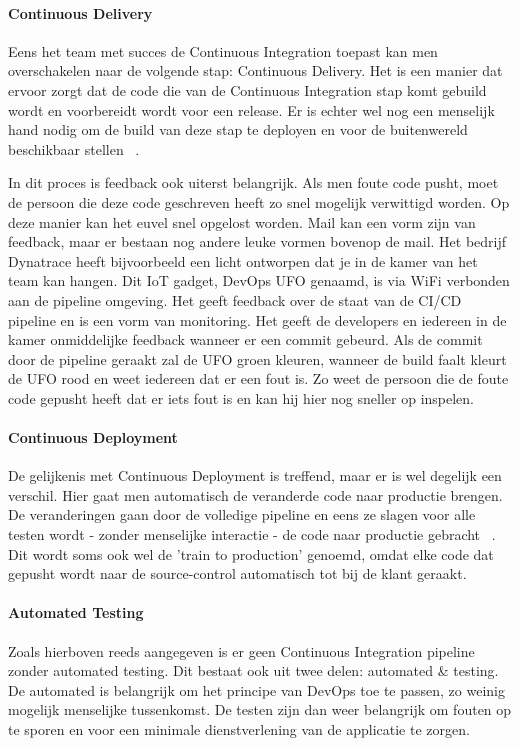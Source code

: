     \paragraph{Continuous Delivery}
    Eens het team met succes de Continuous Integration toepast kan men overschakelen naar de volgende stap: Continuous Delivery.
    Het is een manier dat ervoor zorgt dat de code die van de Continuous Integration stap komt gebuild wordt en voorbereidt wordt voor een release.
    Er is echter wel nog een menselijk hand nodig om de build van deze stap te deployen en voor de buitenwereld beschikbaar stellen ~\autocite{Fowler2013}.
    
    In dit proces is feedback ook uiterst belangrijk. Als men foute code pusht, moet de persoon die deze code geschreven heeft zo snel mogelijk verwittigd worden. Op deze manier kan het euvel snel opgelost worden.
    Mail kan een vorm zijn van feedback, maar er bestaan nog andere leuke vormen bovenop de mail. Het bedrijf Dynatrace heeft bijvoorbeeld een licht ontworpen dat je in de kamer van het team kan hangen. Dit IoT gadget, DevOps UFO genaamd, is via WiFi verbonden aan de pipeline omgeving. Het geeft feedback over de staat van de CI/CD pipeline en is een vorm van monitoring. Het geeft de developers en iedereen in de kamer onmiddelijke feedback wanneer er een commit gebeurd. Als de commit door de pipeline geraakt zal de UFO groen kleuren, wanneer de build faalt kleurt de UFO rood en weet iedereen dat er een fout is. Zo weet de persoon die de foute code gepusht heeft dat er iets fout is en kan hij hier nog sneller op inspelen. 

    \paragraph{Continuous Deployment}
    De gelijkenis met Continuous Deployment is treffend, maar er is wel degelijk een verschil.
    Hier gaat men automatisch de veranderde code naar productie brengen. De veranderingen gaan door de volledige pipeline en eens ze slagen voor alle testen wordt - zonder menselijke interactie - de code naar productie gebracht ~\autocite{Claps2015}.
    Dit wordt soms ook wel de 'train to production' genoemd, omdat elke code dat gepusht wordt naar de source-control automatisch tot bij de klant geraakt.
    
    \paragraph{Automated Testing}
    Zoals hierboven reeds aangegeven is er geen Continuous Integration pipeline zonder automated testing. Dit bestaat ook uit twee delen: automated \& testing. De automated is belangrijk om het principe van DevOps toe te passen, zo weinig mogelijk menselijke tussenkomst. De testen zijn dan weer belangrijk om fouten op te sporen en voor een minimale dienstverlening van de applicatie te zorgen.

